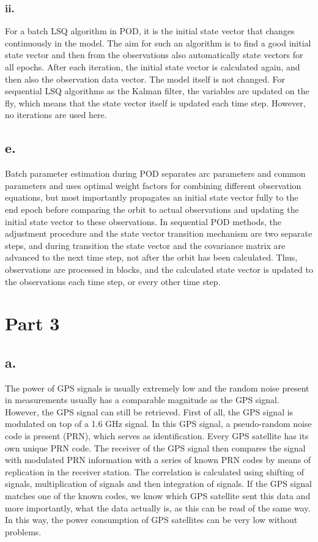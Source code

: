 \documentclass[a4paper,10pt,titlepage]{article}
\begin{document}
\subsubsection*{ii.}
For a batch LSQ algorithm in POD, it is the initial state vector that changes continuously in the model. The aim for such an algorithm is to find a good initial state vector and then from the observations also automatically state vectors for all epochs. After each iteration, the initial state vector is calculated again, and then also the observation data vector. The model itself is not changed. For sequential LSQ algorithms as the Kalman filter, the variables are updated on the fly, which means that the state vector itself is updated each time step. However, no iterations are used here.
\subsection*{e.}
Batch parameter estimation during POD separates arc parameters and common parameters and uses optimal weight factors for combining different observation equations, but most importantly propagates an initial state vector fully to the end epoch before comparing the orbit to actual observations and updating the initial state vector to these observations. In sequential POD methods, the adjustment procedure and the state vector transition mechanism are two separate steps, and during transition the state vector and the covariance matrix are advanced to the next time step, not after the orbit has been calculated. Thus, observations are processed in blocks, and the calculated state vector is updated to the observations each time step, or every other time step.

\section{Part 3}
\subsection*{a.}
The power of GPS signals is usually extremely low and the random noise present in measurements usually has a comparable magnitude as the GPS signal. However, the GPS signal can still be retrieved. First of all, the GPS signal is modulated on top of a 1.6 GHz signal. In this GPS signal, a pseudo-random noise code is present (PRN), which serves as identification. Every GPS satellite has its own unique PRN code. The receiver of the GPS signal then compares the signal with modulated PRN information with a series of known PRN codes by means of replication in the receiver station. The correlation is calculated using shifting of signals, multiplication of signals and then integration of signals. If the GPS signal matches one of the known codes, we know which GPS satellite sent this data and more importantly, what the data actually is, as this can be read of the same way. In this way, the power consumption of GPS satellites can be very low without problems.
\end{document}
